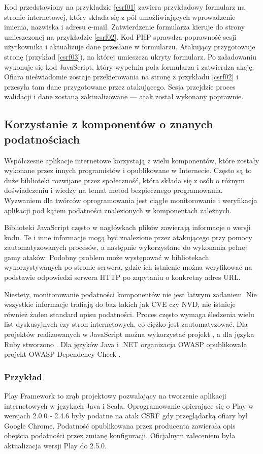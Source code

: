 \documentclass[11pt,a4paper,polish,thesis]{dcsbook}
\begin{document}
Kod przedstawiony na przykładzie \ref{csrf01} zawiera przykładowy formularz na stronie internetowej, który składa się z pól umożliwiających wprowadzenie imienia, nazwiska i adresu e-mail. Zatwierdzenie formularza kieruje do strony umieszczonej na przykładzie \ref{csrf02}. Kod PHP sprawdza poprawność sesji użytkownika i aktualizuje dane przesłane w formularzu. Atakujący przygotowuje stronę (przykład \ref{csrf03}), na której umieszcza ukryty formularz. Po załadowaniu wykonuje się kod JavaScript, który wypełnia pola formularza i zatwierdza akcję. Ofiara nieświadomie zostaje przekierowania na stronę z przykładu \ref{csrf02} i przesyła tam dane przygotowane przez atakującego. Sesja przejdzie proces walidacji i dane zostaną zaktualizowane --- atak został wykonany poprawnie.

\subsection{Korzystanie z komponentów o znanych podatnościach}
Współczesne aplikacje internetowe korzystają z wielu komponentów, które zostały wykonane przez innych programistów i opublikowane w Internecie. Często są to duże biblioteki rozwijane przez społeczność, która składa się z osób o różnym doświadczeniu i wiedzy na temat metod bezpiecznego programowania. Wyzwaniem dla twórców oprogramowania jest ciągłe monitorowanie i weryfikacja aplikacji pod kątem podatności znalezionych w komponentach zależnych. 

Biblioteki JavaScript często w nagłówkach plików zawierają informacje o wersji kodu. Te i inne informacje mogą być znalezione przez atakującego przy pomocy zautomatyzowanych procesów, a następnie wykorzystane do wykonania pełnej gamy ataków. Podobny problem może występować w bibliotekach wykorzystywanych po stronie serwera, gdzie ich istnienie można weryfikować na podstawie odpowiedzi serwera HTTP po zapytaniu o konkretny adres URL. 

Niestety, monitorowanie podatności komponentów nie jest łatwym zadaniem. Nie wszystkie informacje trafiają do baz takich jak CVE czy NVD, nie istnieje również żaden standard opisu podatności. Proces często wymaga śledzenia wielu list dyskusyjnych czy stron internetowych, co ciężko jest zautomatyzować. Dla projektów realizowanych w JavaScript można wykorzystać projekt \cite{nodesec}, a dla języka Ruby stworzono \cite{rubysec}. Dla języków Java i .NET organizacja OWASP opublikowała projekt OWASP Dependency Check \cite{owaspdc}.

\subsubsection*{Przykład}
Play Framework \cite{playfw} to zrąb projektowy pozwalający na tworzenie aplikacji internetowych w językach Java i Scala. Oprogramowanie opierające się o Play w wersjach 2.0.0 - 2.4.6 były podatne na atak CSRF gdy przeglądarką ofiary był Google Chrome. Podatność opublikowana przez producenta \cite{playv1} zawierała opis obejścia podatności przez zmianę konfiguracji. Oficjalnym zaleceniem była aktualizacja wersji Play do 2.5.0.
\end{document}
